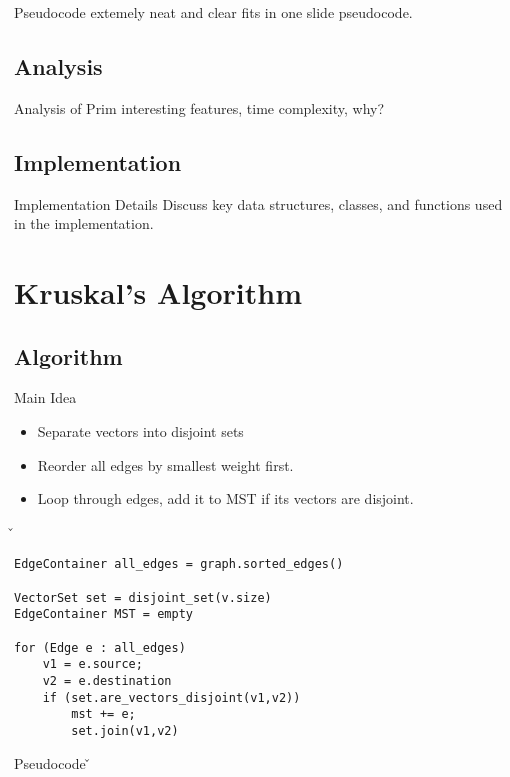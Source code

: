 \documentclass{beamer}
\begin{document}
\begin{frame}{Pseudocode}
    extemely neat and clear fits in one slide pseudocode.
\end{frame}

\subsection{Analysis}
\begin{frame}{Analysis of Prim}
    interesting features, time complexity, why?
\end{frame}

\subsection{Implementation}
\begin{frame}{Implementation Details}
    Discuss key data structures, classes, and functions used in the
    implementation.
\end{frame}


\section{Kruskal's Algorithm}\frame{\sectionpage}
\subsection{Algorithm}
\begin{frame}{Main Idea}
    \begin{itemize}
    \item Separate vectors into disjoint sets
    \item Reorder all edges by smallest weight first.
    \item Loop through edges, add it to MST if its vectors are disjoint.
    \end{itemize}
\end{frame}


\v {
\begin{verbatim}
EdgeContainer all_edges = graph.sorted_edges()

VectorSet set = disjoint_set(v.size)
EdgeContainer MST = empty

for (Edge e : all_edges)
    v1 = e.source;
    v2 = e.destination
    if (set.are_vectors_disjoint(v1,v2))
        mst += e;
        set.join(v1,v2)
\end{verbatim}
}

\begin{frame}{Pseudocode}
\v
\end{frame}
\end{document}
